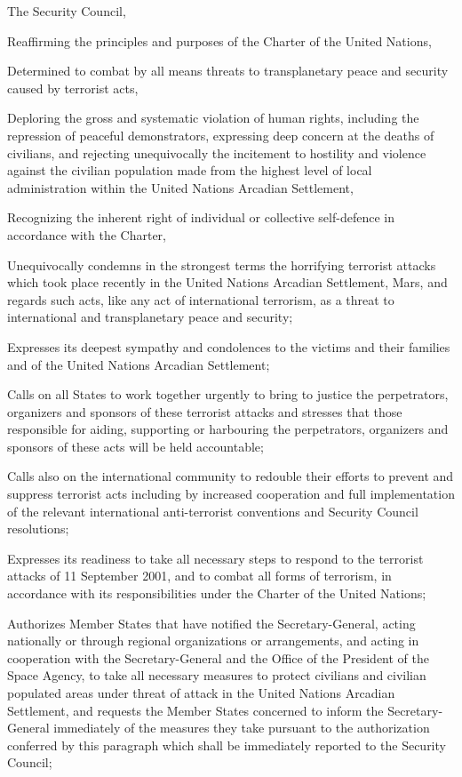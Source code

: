 \StartTimelineDocument
The Security Council,

Reaffirming the principles and purposes of the Charter of the United Nations,

Determined to combat by all means threats to transplanetary peace and security caused by terrorist acts,

Deploring the gross and systematic violation of human rights, including the repression of peaceful demonstrators, expressing deep concern at the deaths of civilians, and rejecting unequivocally the incitement to hostility and violence against the civilian population made from the highest level of local administration within the United Nations Arcadian Settlement,

Recognizing the inherent right of individual or collective self-defence in accordance with the Charter,

\startitemize[n]
\setupwhitespace[big]
\item Unequivocally condemns in the strongest terms the horrifying terrorist attacks which took place recently in the United Nations Arcadian Settlement, Mars, and regards such acts, like any act of international terrorism, as a threat to international and transplanetary peace and security;

\item Expresses its deepest sympathy and condolences to the victims and their families and of the United Nations Arcadian Settlement;

\item Calls on all States to work together urgently to bring to justice the perpetrators, organizers and sponsors of these terrorist attacks and stresses that those responsible for aiding, supporting or harbouring the perpetrators, organizers and sponsors of these acts will be held accountable;

\item Calls also on the international community to redouble their efforts to prevent and suppress terrorist acts including by increased cooperation and full implementation of the relevant international anti-terrorist conventions and Security Council resolutions;

\item Expresses its readiness to take all necessary steps to respond to the terrorist attacks of 11 September 2001, and to combat all forms of terrorism, in accordance with its responsibilities under the Charter of the United Nations;

\item Authorizes Member States that have notified the Secretary-General, acting nationally or through regional organizations or arrangements, and acting in cooperation with the Secretary-General and the Office of the President of the Space Agency, to take all necessary measures to protect civilians and civilian populated areas under threat of attack in the United Nations Arcadian Settlement, and requests the Member States concerned to inform the Secretary-General immediately of the measures they take pursuant to the authorization conferred by this paragraph which shall be immediately reported to the Security Council;


